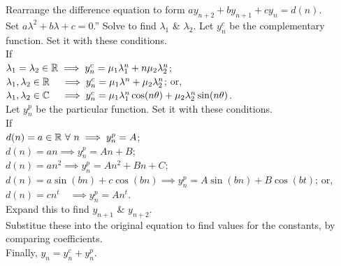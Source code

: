 \documentclass[11pt,a4paper]{article}
\begin{document}
\subtitle{Process}
Rearrange the difference equation to form $ay_{n+2} + by_{n+1} + cy_n = d(n)$.\\
Set $a\lambda^2 + b\lambda + c = 0$.''
Solve to find $\lambda_1$ \& $\lambda_2$.
Let $y_n^c$ be the complementary function. Set it with these conditions.\\
If\\
\-\hspace{2em} $\lambda_1 = \lambda_2 \in \mathbb{R} \implies y_n^c = \mu_1\lambda_1^n + n\mu_2\lambda_2^n$;\\
\-\hspace{2em} $\lambda_1, \lambda_2 \in \mathbb{R}\ \ \ \implies y_n^c = \mu_1\lambda^n + \mu_2\lambda_2^n$; or,\\
\-\hspace{2em} $\lambda_1, \lambda_2 \in \complex \ \ \ \implies y_n^c = \mu_1\lambda_1^n\cos(n\theta) + \mu_2\lambda_2^n\sin(n\theta)$.\\
Let $y_n^p$ be the particular function. Set it with these conditions.\\
If\\
\-\hspace{2em} $d(n) = a \in \mathbb{R}\ \forall\ n \implies y_n^p = A$;\\
\-\hspace{2em} $d(n) = an \implies y_n^p = An + B$;\\
\-\hspace{2em} $d(n) = an^2 \implies y_n^p = An^2 + Bn + C$;\\
\-\hspace{2em} $d(n) = a\sin(bn) + c\cos(bn) \implies y_n^p = A\sin(bn) + B\cos(bt)$; or,\\
\-\hspace{2em} $d(n) = cn^t\quad \implies y_n^p = An^t$.\\
Expand this to find $y_{n+1}$ \& $y_{n+2}$.\\
Substitue these into the original equation to find values for the constants, by comparing coefficients.\\
Finally, $y_n = y_n^c + y_n^p$.\\
\end{document}
